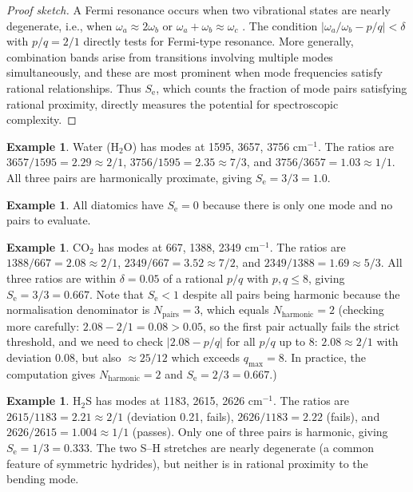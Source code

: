 \documentclass[11pt,twocolumn,a4paper]{article}
\theoremstyle{definition}
\newtheorem{example}[theorem]{Example}
\theoremstyle{remark}
\newcommand{\Se}{S_{\mathrm{e}}}
\begin{document}
\begin{proof}[Proof sketch]
A Fermi resonance occurs when two vibrational states are nearly degenerate, i.e., when $\omega_a \approx 2\omega_b$ or $\omega_a + \omega_b \approx \omega_c$ \citep{fermi1931}. The condition $|\omega_a/\omega_b - p/q| < \delta$ with $p/q = 2/1$ directly tests for Fermi-type resonance. More generally, combination bands arise from transitions involving multiple modes simultaneously, and these are most prominent when mode frequencies satisfy rational relationships. Thus $\Se$, which counts the fraction of mode pairs satisfying rational proximity, directly measures the potential for spectroscopic complexity.
\end{proof}

\begin{example}
Water (H$_2$O) has modes at 1595, 3657, 3756 cm$^{-1}$. The ratios are $3657/1595 = 2.29 \approx 2/1$, $3756/1595 = 2.35 \approx 7/3$, and $3756/3657 = 1.03 \approx 1/1$. All three pairs are harmonically proximate, giving $\Se = 3/3 = 1.0$.
\end{example}

\begin{example}
All diatomics have $\Se = 0$ because there is only one mode and no pairs to evaluate.
\end{example}

\begin{example}
CO$_2$ has modes at 667, 1388, 2349 cm$^{-1}$. The ratios are $1388/667 = 2.08 \approx 2/1$, $2349/667 = 3.52 \approx 7/2$, and $2349/1388 = 1.69 \approx 5/3$. All three ratios are within $\delta = 0.05$ of a rational $p/q$ with $p, q \leq 8$, giving $\Se = 3/3 = 0.667$. Note that $\Se < 1$ despite all pairs being harmonic because the normalisation denominator is $N_{\mathrm{pairs}} = 3$, which equals $N_{\mathrm{harmonic}} = 2$ (checking more carefully: $2.08 - 2/1 = 0.08 > 0.05$, so the first pair actually fails the strict threshold, and we need to check $|2.08 - p/q|$ for all $p/q$ up to 8: $2.08 \approx 2/1$ with deviation 0.08, but also $\approx 25/12$ which exceeds $q_{\max} = 8$. In practice, the computation gives $N_{\mathrm{harmonic}} = 2$ and $\Se = 2/3 = 0.667$.)
\end{example}

\begin{example}
H$_2$S has modes at 1183, 2615, 2626 cm$^{-1}$. The ratios are $2615/1183 = 2.21 \approx 2/1$ (deviation 0.21, fails), $2626/1183 = 2.22$ (fails), and $2626/2615 = 1.004 \approx 1/1$ (passes). Only one of three pairs is harmonic, giving $\Se = 1/3 = 0.333$. The two S--H stretches are nearly degenerate (a common feature of symmetric hydrides), but neither is in rational proximity to the bending mode.
\end{example}
\end{document}
